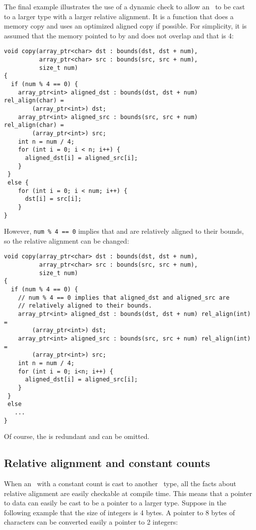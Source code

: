 The final example illustrates the use of a dynamic check to allow an
\arrayptrchar\ to be cast to a larger type with a larger relative alignment.
It is a function that does a memory copy and uses an optimized aligned copy if
possible.  For simplicity, it is assumed that the memory pointed to by
 and  does not overlap and that  is 4:
\begin{lstlisting}
void copy(array_ptr<char> dst : bounds(dst, dst + num),
          array_ptr<char> src : bounds(src, src + num), 
          size_t num)
{
  if (num % 4 == 0) {
    array_ptr<int> aligned_dst : bounds(dst, dst + num) rel_align(char) =
        (array_ptr<int>) dst;
    array_ptr<int> aligned_src : bounds(src, src + num) rel_align(char) =
        (array_ptr<int>) src;
    int n = num / 4;
    for (int i = 0; i < n; i++) {
      aligned_dst[i] = aligned_src[i];
    }
 }
 else {
    for (int i = 0; i < num; i++) {
      dst[i] = src[i];
    }
}
\end{lstlisting}

However, \lstinline|num % 4 == 0| implies that  and
 are relatively aligned to their bounds, so the
relative alignment can be changed:

\begin{lstlisting}
void copy(array_ptr<char> dst : bounds(dst, dst + num),
          array_ptr<char> src : bounds(src, src + num), 
          size_t num)
{
  if (num % 4 == 0) {
    // num % 4 == 0 implies that aligned_dst and aligned_src are
    // relatively aligned to their bounds.
    array_ptr<int> aligned_dst : bounds(dst, dst + num) rel_align(int) =
        (array_ptr<int>) dst;
    array_ptr<int> aligned_src : bounds(src, src + num) rel_align(int) =
        (array_ptr<int>) src;
    int n = num / 4;
    for (int i = 0; i<n; i++) {
      aligned_dst[i] = aligned_src[i];
    }
 }
 else  
   ...
}
\end{lstlisting}

Of course, the  is redundant and can be omitted.

\subsection{Relative alignment and constant counts}

When an \arrayptr\ with a constant count is cast to another
\arrayptr\ type, all the facts about relative alignment are
easily checkable at compile time. This means that a pointer to data can
easily be cast to be a pointer to a larger type. Suppose in the
following example that the size of integers is 4 bytes. A pointer to 8
bytes of characters can be converted easily a pointer to 2 integers:

